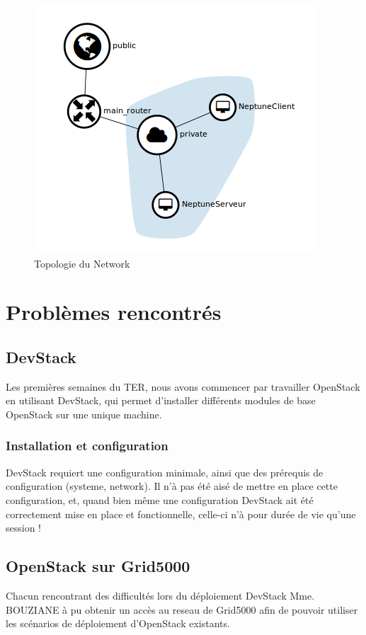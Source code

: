 \documentclass{report}
\begin{document}
    \begin{figure}[!h]
        \includegraphics[width=\textwidth]{network-topo}
        \caption{Topologie du Network}
    \end{figure}

\chapter{Problèmes rencontrés}
    \section{DevStack}
        Les premières semaines du TER, nous avons commencer par travailler OpenStack en utilisant DevStack, 
        qui permet d'installer différents modules de base OpenStack sur une unique machine.\bigbreak
        \subsection{Installation et configuration}
            DevStack requiert une configuration minimale, ainsi que des prérequis de configuration (systeme, network).\bigbreak
            Il n'à pas été aisé de mettre en place cette configuration, et, quand bien même une configuration 
            DevStack ait été correctement mise en place et fonctionnelle, celle-ci n'à pour durée de vie qu'une session !\bigbreak

    \section{OpenStack sur Grid5000}
        Chacun rencontrant des difficultés lors du déploiement DevStack Mme. BOUZIANE à pu obtenir un accès au reseau 
        de Grid5000 afin de pouvoir utiliser les scénarios de déploiement d'OpenStack existants.\bigbreak
\end{document}
